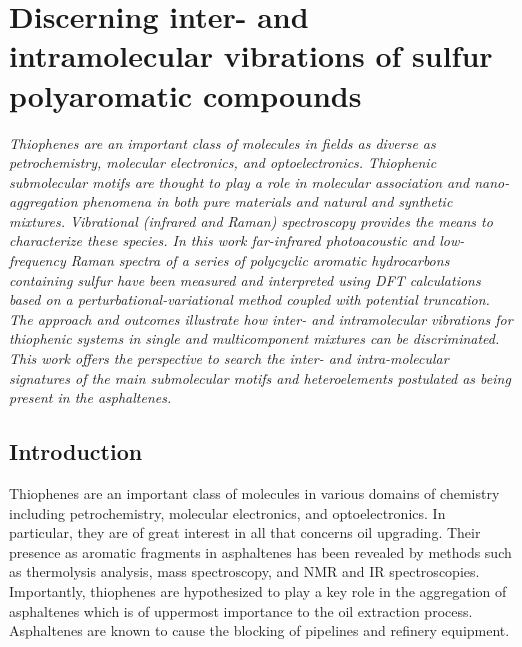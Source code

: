 \chapter[Discerning inter- and intramolecular vibrations]{Discerning inter- and intramolecular vibrations of sulfur polyaromatic compounds}
\minitoc
\restoregeometry

\newpage	
	
\vspace*{6cm}	
	\textit{Thiophenes are an important class of molecules in fields as diverse as petrochemistry, molecular electronics, and optoelectronics. Thiophenic submolecular motifs are thought to play a role in molecular association and nano-aggregation phenomena in both pure materials and natural and synthetic mixtures. Vibrational (infrared and Raman) spectroscopy provides the means to characterize these species. In this work far-infrared photoacoustic and low-frequency Raman spectra of a series of polycyclic aromatic hydrocarbons containing sulfur have been measured and interpreted using DFT calculations based on a perturbational-variational method coupled with potential truncation. The approach and outcomes illustrate how inter- and intramolecular vibrations for thiophenic systems in single and multicomponent mixtures can be discriminated. This work offers the perspective to search the inter- and intra-molecular signatures of the main submolecular motifs and heteroelements postulated as being present in the asphaltenes.}


	\newpage
	
	\section{Introduction}
	
	Thiophenes are an important class of molecules in various domains of chemistry including petrochemistry, \cite{waldo1991sulfur,mitra1998determination,lobodin2015separation}  molecular electronics,\cite{katz2004recent,ong2008thiophene,vivas2011linear,silva2011controlling} and optoelectronics.\cite{kim2010one} In particular, they are of great interest in all that concerns oil upgrading. \cite{kishita2003upgrading,samokhvalov2011heterogeneous,chen2015acylation} Their presence as aromatic fragments in asphaltenes has been revealed by methods such as thermolysis analysis,\cite{strausz1992molecular} mass spectroscopy,\cite{liu2010molecular,karimi2011quantitative}  and NMR and IR spectroscopies. \cite{coelho2012elucidation,alhumaidan2016impact} Importantly, thiophenes are hypothesized to play a key role in the aggregation of asphaltenes\cite{widany2001electronic,liu2014adjusting} which is of uppermost importance to the oil extraction process. Asphaltenes are known to cause the blocking of pipelines and refinery equipment.\\
	

